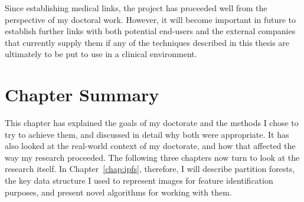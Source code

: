 Since establishing medical links, the project has proceeded well from the perspective of my doctoral work. However, it will become important in future to establish further links with both potential end-users and the external companies that currently supply them if any of the techniques described in this thesis are ultimately to be put to use in a clinical environment.

\section{Chapter Summary}

This chapter has explained the goals of my doctorate and the methods I chose to try to achieve them, and discussed in detail why both were appropriate. It has also looked at the real-world context of my doctorate, and how that affected the way my research proceeded. The following three chapters now turn to look at the research itself. In Chapter~\ref{chap:ipfs}, therefore, I will describe partition forests, the key data structure I used to represent images for feature identification purposes, and present novel algorithms for working with them.
